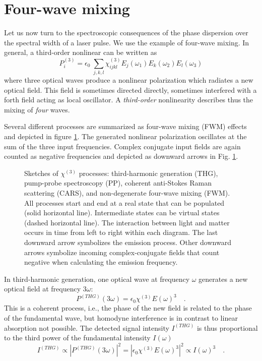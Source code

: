 		
\section{Four-wave mixing}

Let us now turn to the spectroscopic consequences of the phase dispersion over the spectral width of a laser pulse. We use the example of four-wave mixing. In general, a third-order nonlinear can be written as
\begin{equation}
  P^{(3)}_i = \epsilon_0 \; 
    \sum_{j,k,l} \chi^{(3)}_{ijkl} E_j(\omega_1) E_k(\omega_2) E_l(\omega_3)  
\end{equation}		
where three optical waves produce a nonlinear polarization which radiates a new optical field. This field is sometimes directed directly, sometimes interfered with  a forth field acting as local oscillator. A \emph{third-order} nonlinearity describes thus the mixing of \emph{four} waves.
		
		
Several different processes are 	summarized as four-wave mixing (FWM) effects and depicted in figure \ref{fig:processes}.  The generated nonlinear polarization oscillates at the sum of the three input frequencies. Complex conjugate input fields are again counted as negative frequencies and depicted as downward arrows in Fig. \ref{fig:processes}.
	
\begin{figure}
   
\caption{Sketches of  $\chi^{(3)}$ processes:
%
third-harmonic generation (THG), pump-probe spectroscopy (PP), coherent anti-Stokes Raman scattering (CARS), and  non-degenerate four-wave mixing (FWM).
%
 All processes start and end at a real state  that can be populated (solid horizontal line). Intermediate states can be virtual states (dashed horizontal line). The interaction between light and matter occurs in time from left to right within each diagram. The last downward arrow symbolizes the emission process. Other downward  arrows symbolize incoming complex-conjugate fields that count negative when calculating the emission frequency.
\label{fig:processes}}
\end{figure}

In third-harmonic generation, one optical wave at frequency $\omega$ generates a new optical field at frequency $3 \omega$: 
%
\begin{equation}
P^{(THG)}(3 \omega) = \epsilon_0 \chi^{(3)} E(\omega)^3  \quad .
\label{eq:chi3-thg}
\end{equation}
%
This is a coherent process, i.e., the phase of the new field is related to the phase of the fundamental wave, but homodyne interference is in contrast to linear absorption not possible. The detected signal intensity $I^{(THG)}$ is thus proportional to the third power of the fundamental intensity $I(\omega)$
\begin{equation}
I^{(THG)} \propto \left| P^{(THG)}(3 \omega) \right|^2 = \left| \epsilon_0 \chi^{(3)} E(\omega)^3 \right|^2 \propto I(\omega)^3 \quad .
\label{eq:intensi-thg}
\end{equation}



